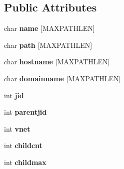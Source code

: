\subsection*{Public Attributes}
\begin{DoxyCompactItemize}
\item 
\hypertarget{structvimage__status_a24e0e4c64be1030e52d20f17dc8ccac1}{char {\bfseries name} \mbox{[}M\+A\+X\+P\+A\+T\+H\+L\+E\+N\mbox{]}}\label{structvimage__status_a24e0e4c64be1030e52d20f17dc8ccac1}

\item 
\hypertarget{structvimage__status_aaf52a7d6ebedd2c6f49dd238a1fbe50b}{char {\bfseries path} \mbox{[}M\+A\+X\+P\+A\+T\+H\+L\+E\+N\mbox{]}}\label{structvimage__status_aaf52a7d6ebedd2c6f49dd238a1fbe50b}

\item 
\hypertarget{structvimage__status_aeadd9fc8980f30a219e2a148b9a6fa50}{char {\bfseries hostname} \mbox{[}M\+A\+X\+P\+A\+T\+H\+L\+E\+N\mbox{]}}\label{structvimage__status_aeadd9fc8980f30a219e2a148b9a6fa50}

\item 
\hypertarget{structvimage__status_aea5da2712a3e01554e372dc041024e70}{char {\bfseries domainname} \mbox{[}M\+A\+X\+P\+A\+T\+H\+L\+E\+N\mbox{]}}\label{structvimage__status_aea5da2712a3e01554e372dc041024e70}

\item 
\hypertarget{structvimage__status_a44176d36f236a9de92dac7eef22c7e68}{int {\bfseries jid}}\label{structvimage__status_a44176d36f236a9de92dac7eef22c7e68}

\item 
\hypertarget{structvimage__status_a25e8d2ef24bf0d106eb8ada8021f1883}{int {\bfseries parentjid}}\label{structvimage__status_a25e8d2ef24bf0d106eb8ada8021f1883}

\item 
\hypertarget{structvimage__status_a841fce69214085aa7b839b52061aab8f}{int {\bfseries vnet}}\label{structvimage__status_a841fce69214085aa7b839b52061aab8f}

\item 
\hypertarget{structvimage__status_a749611ae70ca2f03f7bf78d43a05ad8e}{int {\bfseries childcnt}}\label{structvimage__status_a749611ae70ca2f03f7bf78d43a05ad8e}

\item 
\hypertarget{structvimage__status_ad6e9aed4a74d714373341059bf94f94d}{int {\bfseries childmax}}\label{structvimage__status_ad6e9aed4a74d714373341059bf94f94d}


\end{DoxyCompactItemize}
